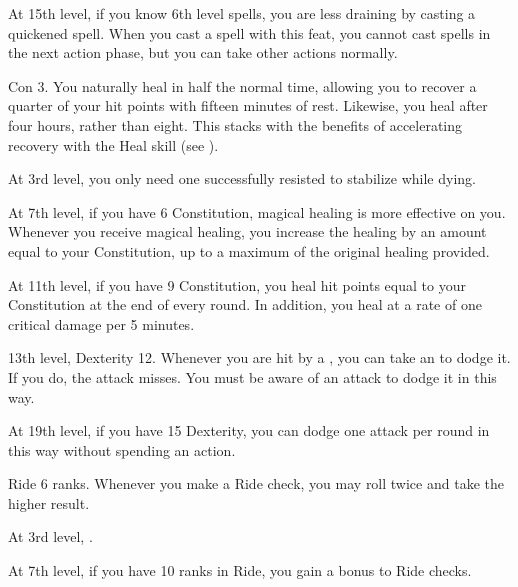     At 15th level, if you know 6th level spells, you are less draining by casting a quickened spell.
    When you cast a spell with this feat, you cannot cast spells in the next action phase, but you can take other actions normally.

    \featpre Con 3.
    \featben You naturally heal in half the normal time, allowing you to recover a quarter of your hit points with fifteen minutes of rest.
    Likewise, you heal  after four hours, rather than eight.
    This stacks with the benefits of accelerating recovery with the Heal skill (see ).

    At 3rd level, you only need one successfully resisted  to stabilize while dying.

    At 7th level, if you have 6 Constitution, magical healing is more effective on you.
    Whenever you receive magical healing, you increase the healing by an amount equal to your Constitution, up to a maximum of the original healing provided.

    At 11th level, if you have 9 Constitution, you heal hit points equal to your Constitution at the end of every round.
    In addition, you heal  at a rate of one critical damage per 5 minutes.
    \magical

    \featpres 13th level, Dexterity 12.
    \featben Whenever you are hit by a , you can take an  to dodge it.
    If you do, the attack misses.
    You must be aware of an attack to dodge it in this way.

    At 19th level, if you have 15 Dexterity, you can dodge one attack per round in this way without spending an action.

    \featpre Ride 6 ranks.
    \featben Whenever you make a Ride check, you may roll twice and take the higher result.

    At 3rd level, \tdash.

    At 7th level, if you have 10 ranks in Ride, you gain a  bonus to Ride checks.

